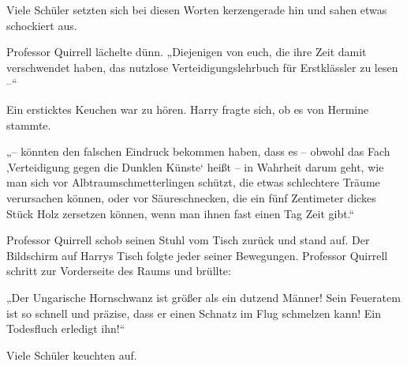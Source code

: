 Viele Schüler setzten sich bei diesen Worten kerzengerade hin und sahen etwas schockiert aus.

Professor Quirrell lächelte dünn. „Diejenigen von euch, die ihre Zeit damit verschwendet haben, das nutzlose Verteidigungslehrbuch für Erstklässler zu lesen –“

Ein ersticktes Keuchen war zu hören. Harry fragte sich, ob es von Hermine stammte.

„– könnten den falschen Eindruck bekommen haben, dass es – obwohl das Fach ‚Verteidigung gegen die Dunklen Künste‘ heißt – in Wahrheit darum geht, wie man sich vor Albtraumschmetterlingen schützt, die etwas schlechtere Träume verursachen können, oder vor Säureschnecken, die ein fünf Zentimeter dickes Stück Holz zersetzen können, wenn man ihnen fast einen Tag Zeit gibt.“

Professor Quirrell schob seinen Stuhl vom Tisch zurück und stand auf. Der Bildschirm auf Harrys Tisch folgte jeder seiner Bewegungen. Professor Quirrell schritt zur Vorderseite des Raums und brüllte:

„Der Ungarische Hornschwanz ist größer als ein dutzend Männer! Sein Feueratem ist so schnell und präzise, dass er einen Schnatz im Flug schmelzen kann! Ein Todesfluch erledigt ihn!“

Viele Schüler keuchten auf.

